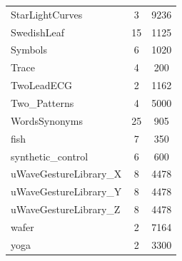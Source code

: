 \documentclass[natbib,smallextended]{svjour3}
\begin{document}
\begin{table} [h!]
\begin{center}
\begin{tabular}{lcc}
StarLightCurves  &  3 & 9236 \\
SwedishLeaf & 15 & 1125 \\
Symbols  &  6 & 1020 \\
Trace &   4 &  200 \\
TwoLeadECG  &  2 & 1162 \\
Two\_Patterns  &  4 & 5000 \\
WordsSynonyms  & 25 &  905 \\
fish  &  7 &  350 \\
synthetic\_control  &  6 &  600 \\
uWaveGestureLibrary\_X  &  8 & 4478 \\
uWaveGestureLibrary\_Y  &  8 & 4478 \\
uWaveGestureLibrary\_Z  &  8 & 4478 \\
wafer  &  2 & 7164 \\
yoga  &  2 & 3300 \\
\end{tabular}
\end{center}
\end{table}
\end{document}
